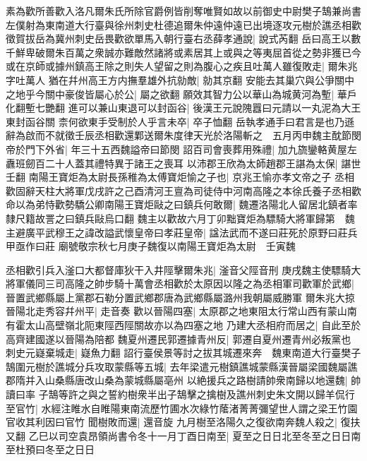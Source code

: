 素為歡所善歡入洛凡爾朱氏所除官爵例皆削奪唯賢如故以前御史中尉樊子鵠兼尚書左僕射為東南道大行臺與徐州刺史杜德追爾朱仲遠仲遠已出境逐攻元樹於譙丞相歡徵賀拔岳為冀州刺史岳畏歡欲單馬入朝行臺右丞薛孝通說|{
	說式芮翻}
岳曰高王以數千鮮卑破爾朱百萬之衆誠亦難敵然諸將或素居其上或與之等夷屈首從之勢非獲已今或在京師或據州鎮高王除之則失人望留之則為腹心之疾且吐萬人雖復敗走|{
	爾朱兆字吐萬人}
猶在幷州高王方内撫羣雄外抗勍敵|{
	勍其京翻}
安能去其巢穴與公爭關中之地乎今關中豪俊皆屬心於公|{
	屬之欲翻}
願效其智力公以華山為城黄河為塹|{
	華戶化翻塹七艷翻}
進可以兼山東退可以封函谷|{
	後漢王元說隗囂曰元請以一丸泥為大王東封函谷關}
柰何欲東手受制於人乎言未卒|{
	卒子恤翻}
岳執孝通手曰君言是也乃遜辭為啟而不就徵壬辰丞相歡還鄴送爾朱度律天光於洛陽斬之　五月丙申魏主酖節閔帝於門下外省|{
	年三十五西魏謚帝曰節閔}
詔百司會喪葬用殊禮|{
	加九旒鑾輅黄屋左纛班劒百二十人蓋其禮特異于諸王之喪耳}
以沛郡王欣為太師趙郡王諶為太保|{
	諶世壬翻}
南陽王寶炬為太尉長孫稚為太傅寶炬愉之子也|{
	京兆王愉亦孝文帝之子}
丞相歡固辭天柱大將軍戊戌許之己酉清河王亶為司徒侍中河南高隆之本徐氏養子丞相歡命以為弟恃歡勢驕公卿南陽王寶炬敺之曰鎮兵何敢爾|{
	魏遷洛陽北人留居北鎮者率隸尺籍故詈之曰鎮兵敺烏口翻}
魏主以歡故六月丁卯黜寶炬為驃騎大將軍歸第　魏主避廣平武穆王之諱改謚武懷皇帝曰孝莊皇帝|{
	諡法武而不遂曰莊死於原野曰莊兵甲亟作曰莊}
廟號敬宗秋七月庚子魏復以南陽王寶炬為太尉　壬寅魏

丞相歡引兵入滏口大都督庫狄干入井陘擊爾朱兆|{
	滏音父陘音刑}
庚戌魏主使驃騎大將軍儀同三司高隆之帥步騎十萬會丞相歡於太原因以隆之為丞相軍司歡軍於武鄉|{
	晉置武鄉縣屬上黨郡石勒分置武鄉郡唐為武鄉縣屬潞州我朝屬威勝軍}
爾朱兆大掠晉陽北走秀容幷州平|{
	走音奏}
歡以晉陽四塞|{
	太原郡之地東阻太行常山西有蒙山南有霍太山高壁嶺北阨東陘西陘關故亦以為四塞之地}
乃建大丞相府而居之|{
	自此至於高齊建國遂以晉陽為陪都}
魏夏州遷民郭遷據青州反|{
	郭遷自夏州遷青州必叛黨也}
刺史元嶷棄城走|{
	嶷魚力翻}
詔行臺侯景等討之拔其城遷來奔　魏東南道大行臺樊子鵠圍元樹於譙城分兵攻取蒙縣等五城|{
	去年梁遣元樹鎮譙城蒙縣漢晉屬梁國魏屬譙郡隋并入山桑縣唐改山桑為蒙城縣屬亳州}
以絶援兵之路樹請帥衆南歸以地還魏|{
	帥讀曰率}
子鵠等許之與之誓約樹衆半出子鵠擊之擒樹及譙州刺史朱文開以歸羊侃行至官竹|{
	水經注睢水自睢陽東南流歷竹圃水次綠竹䕃渚菁菁彌望世人謂之梁王竹園官收其利因曰官竹}
聞樹敗而還|{
	還音旋}
九月樹至洛陽久之復欲南奔魏人殺之|{
	復扶又翻}
乙巳以司空袁昂領尚書令冬十一月丁酉日南至|{
	夏至之日日北至冬至之日日南至杜預曰冬至之日日}


